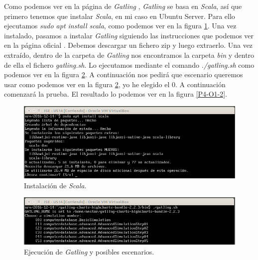 \documentclass[a4paper,titlepage,12pt]{report}	%
\numberwithin{figure}{section} %
\numberwithin{table}{section} %
\begin{document}
	Como podemos ver en la página de \textit{Gatling} \cite{gatling}, \textit{Gatling} se basa en \textit{Scala}, así que primero tenemos que instalar \textit{Scala}, en mi caso en Ubuntu Server. Para ello ejecutamos \textit{sudo apt install scala}, como podemos ver en la figura \ref{P4-O1-instalacion}. Una vez instalado, pasamos a instalar \textit{Gatling} siguiendo las instrucciones que podemos ver en la página oficial \cite{gatling_download}. Debemos descargar un fichero zip y luego extraerlo. Una vez extraído, dentro de la carpeta de \textit{Gatling} nos encontramos la carpeta \textit{bin} y dentro de ella el fichero \textit{gatling.sh}. Lo ejecutamos mediante el comando \textit{./gatling.sh} como podemos ver en la figura \ref{P4-O1-1}. A continuación nos pedirá que escenario queremos usar como podemos ver en la figura \ref{P4-O1-1}, yo he elegido el 0. A continuación comenzará la prueba. El resultado lo podemos ver en la figura \ref{P4-O1-2}.
	
	\begin{figure}[H]
		\includegraphics[width=\linewidth]{./Imagenes/P4/O1-instalacion.png}
		\vspace{-0.5cm}
		\caption[Instalación de \textit{Scala}.]{Instalación de \textit{Scala}.}
		\label{P4-O1-instalacion}
	\end{figure}
	
	\begin{figure}[H]
		\includegraphics[width=\linewidth]{./Imagenes/P4/O1-1.png}
		\vspace{-0.5cm}
		\caption[Ejecución de \textit{Gatling} y posibles escenarios.]{Ejecución de \textit{Gatling} y posibles escenarios.}
		\label{P4-O1-1}
	\end{figure}
	
\end{document}
